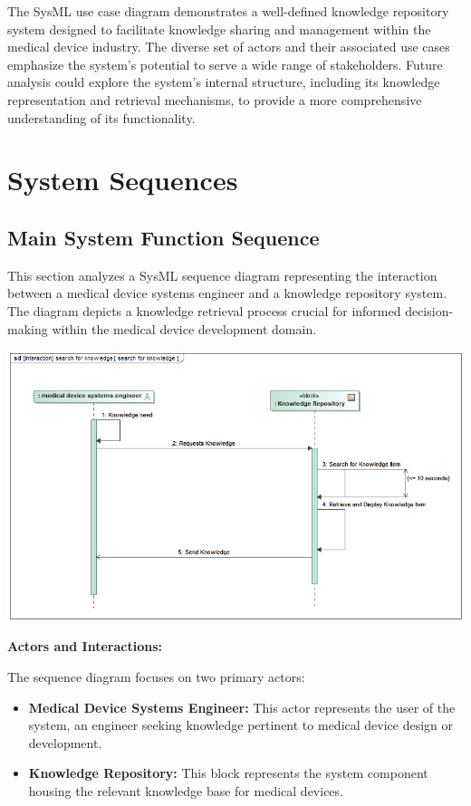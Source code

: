 \documentclass[
  letterpaper,
  DIV=11,
  numbers=noendperiod]{scrreprt}
\begin{document}
The SysML use case diagram demonstrates a well-defined knowledge
repository system designed to facilitate knowledge sharing and
management within the medical device industry. The diverse set of actors
and their associated use cases emphasize the system's potential to serve
a wide range of stakeholders. Future analysis could explore the system's
internal structure, including its knowledge representation and retrieval
mechanisms, to provide a more comprehensive understanding of its
functionality.

\section{System Sequences}\label{system-sequences}

\subsection{Main System Function
Sequence}\label{main-system-function-sequence}

This section analyzes a SysML sequence diagram representing the
interaction between a medical device systems engineer and a knowledge
repository system. The diagram depicts a knowledge retrieval process
crucial for informed decision-making within the medical device
development domain.

\includegraphics{images/paste-4.png}

\textbf{Actors and Interactions:}

The sequence diagram focuses on two primary actors:

\begin{itemize}
\item
  \textbf{Medical Device Systems Engineer:} This actor represents the
  user of the system, an engineer seeking knowledge pertinent to medical
  device design or development.
\item
  \textbf{Knowledge Repository:} This block represents the system
  component housing the relevant knowledge base for medical devices.
\end{itemize}
\end{document}
